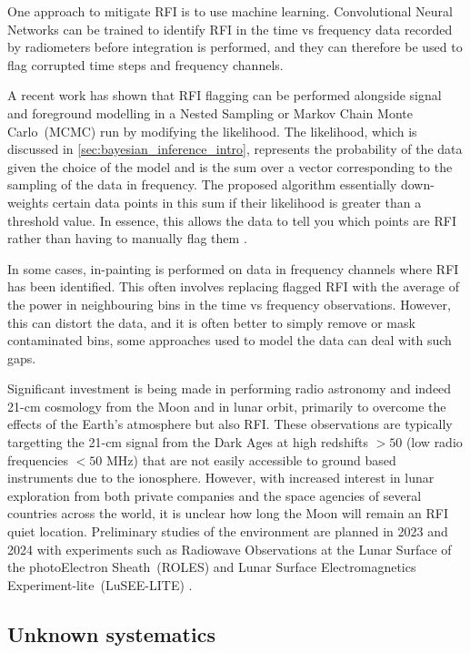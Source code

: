 One approach to mitigate RFI is to use machine learning. Convolutional Neural Networks can be trained to identify RFI in the time vs frequency data recorded by radiometers before integration is performed, and they can therefore be used to flag corrupted time steps and frequency channels.

A recent work has shown that RFI flagging can be performed alongside signal and foreground modelling in a Nested Sampling or Markov Chain Monte Carlo~(MCMC) run by modifying the likelihood. The likelihood, which is discussed in \cref{sec:bayesian_inference_intro}, represents the probability of the data given the choice of the model and is the sum over a vector corresponding to the sampling of the data in frequency. The proposed algorithm essentially down-weights certain data points in this sum if their likelihood is greater than a threshold value. In essence, this allows the data to tell you which points are RFI rather than having to manually flag them \cite{Leeney_RFI_2022}.

In some cases, in-painting is performed on data in frequency channels where RFI has been identified. This often involves replacing flagged RFI with the average of the power in neighbouring bins in the time vs frequency observations. However, this can distort the data, and it is often better to simply remove or mask contaminated bins, some approaches used to model the data can deal with such gaps. 

Significant investment is being made in performing radio astronomy and indeed 21-cm cosmology from the Moon and in lunar orbit, primarily to overcome the effects of the Earth's atmosphere but also RFI. These observations are typically targetting the 21-cm signal from the Dark Ages at high redshifts $> 50$ (low radio frequencies $< 50$ MHz) that are not easily accessible to ground based instruments due to the ionosphere. However, with increased interest in lunar exploration from both private companies and the space agencies of several countries across the world, it is unclear how long the Moon will remain an RFI quiet location. Preliminary studies of the environment are planned in 2023 and 2024 with experiments such as Radiowave Observations at the Lunar Surface of the photoElectron Sheath~(ROLES) and Lunar Surface Electromagnetics Experiment-lite~(LuSEE-LITE) \cite{Burns_lusee_2021}.

\subsection{Unknown systematics}

